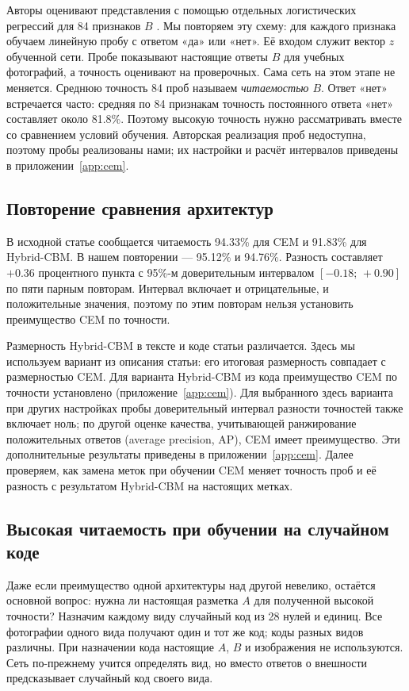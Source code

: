 \documentclass[10pt]{article}
\newcommand{\ci}[2]{[#1;\,#2]}
\begin{document}
Авторы оценивают представления с помощью отдельных логистических регрессий для 84 признаков $B$ \citep[приложение~A.9]{cem}. Мы повторяем эту схему: для каждого признака обучаем линейную пробу с ответом «да» или «нет». Её входом служит вектор $z$ обученной сети. Пробе показывают настоящие ответы $B$ для учебных фотографий, а точность оценивают на проверочных. Сама сеть на этом этапе не меняется. Среднюю точность 84 проб называем \emph{читаемостью $B$}. Ответ «нет» встречается часто: средняя по 84 признакам точность постоянного ответа «нет» составляет около 81.8\%. Поэтому высокую точность нужно рассматривать вместе со сравнением условий обучения. Авторская реализация проб недоступна, поэтому пробы реализованы нами; их настройки и расчёт интервалов приведены в приложении~\ref{app:cem}.

\subsection{Повторение сравнения архитектур}
В исходной статье сообщается читаемость 94.33\% для CEM и 91.83\% для Hybrid-CBM. В нашем повторении --- 95.12\% и 94.76\%. Разность составляет $+0.36$ процентного пункта с 95\%-м доверительным интервалом $\ci{-0.18}{+0.90}$ по пяти парным повторам. Интервал включает и отрицательные, и положительные значения, поэтому по этим повторам нельзя установить преимущество CEM по точности.

Размерность Hybrid-CBM в тексте и коде статьи различается. Здесь мы используем вариант из описания статьи: его итоговая размерность совпадает с размерностью CEM. Для варианта Hybrid-CBM из кода преимущество CEM по точности установлено (приложение~\ref{app:cem}). Для выбранного здесь варианта при других настройках пробы доверительный интервал разности точностей также включает ноль; по другой оценке качества, учитывающей ранжирование положительных ответов (average precision, AP), CEM имеет преимущество. Эти дополнительные результаты приведены в приложении~\ref{app:cem}. Далее проверяем, как замена меток при обучении CEM меняет точность проб и её разность с результатом Hybrid-CBM на настоящих метках.

\subsection{Высокая читаемость при обучении на случайном коде}
Даже если преимущество одной архитектуры над другой невелико, остаётся основной вопрос: нужна ли настоящая разметка $A$ для полученной высокой точности? Назначим каждому виду случайный код из 28 нулей и единиц. Все фотографии одного вида получают один и тот же код; коды разных видов различны. При назначении кода настоящие $A$, $B$ и изображения не используются. Сеть по-прежнему учится определять вид, но вместо ответов о внешности предсказывает случайный код своего вида.
\end{document}
